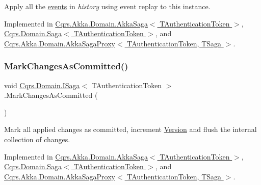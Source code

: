 Apply all the \hyperlink{}{events} in {\itshape history}  using event replay to this instance. 



Implemented in \hyperlink{classCqrs_1_1Akka_1_1Domain_1_1AkkaSaga_a40b859bc15c2f7c87a21b07f9bc9548c_a40b859bc15c2f7c87a21b07f9bc9548c}{Cqrs.\+Akka.\+Domain.\+Akka\+Saga$<$ T\+Authentication\+Token $>$}, \hyperlink{classCqrs_1_1Domain_1_1Saga_a6029fc09445e2093f7fb40e304a04ff8_a6029fc09445e2093f7fb40e304a04ff8}{Cqrs.\+Domain.\+Saga$<$ T\+Authentication\+Token $>$}, and \hyperlink{classCqrs_1_1Akka_1_1Domain_1_1AkkaSagaProxy_a21b69799b046c1fcdf5b2443699dee0c_a21b69799b046c1fcdf5b2443699dee0c}{Cqrs.\+Akka.\+Domain.\+Akka\+Saga\+Proxy$<$ T\+Authentication\+Token, T\+Saga $>$}.

\mbox{\label{interfaceCqrs_1_1Domain_1_1ISaga_a85c75f80bc5be4bad7f1d9f1231bfba7_a85c75f80bc5be4bad7f1d9f1231bfba7}} 
\subsubsection{\texorpdfstring{Mark\+Changes\+As\+Committed()}{MarkChangesAsCommitted()}}
{\footnotesize\ttfamily void \hyperlink{interfaceCqrs_1_1Domain_1_1ISaga}{Cqrs.\+Domain.\+I\+Saga}$<$ T\+Authentication\+Token $>$.Mark\+Changes\+As\+Committed (\begin{DoxyParamCaption}{ }\end{DoxyParamCaption})}



Mark all applied changes as committed, increment \hyperlink{interfaceCqrs_1_1Domain_1_1ISaga_a83a02ff45543d670356dde4149cdc614_a83a02ff45543d670356dde4149cdc614}{Version} and flush the internal collection of changes. 



Implemented in \hyperlink{classCqrs_1_1Akka_1_1Domain_1_1AkkaSaga_a83269fac4653cca097461e924feaea7f_a83269fac4653cca097461e924feaea7f}{Cqrs.\+Akka.\+Domain.\+Akka\+Saga$<$ T\+Authentication\+Token $>$}, \hyperlink{classCqrs_1_1Domain_1_1Saga_a9caac842ea6e88d6e502b63ca1820fe4_a9caac842ea6e88d6e502b63ca1820fe4}{Cqrs.\+Domain.\+Saga$<$ T\+Authentication\+Token $>$}, and \hyperlink{classCqrs_1_1Akka_1_1Domain_1_1AkkaSagaProxy_a5a5c012bc0f7f957b8bd2298956ca9ae_a5a5c012bc0f7f957b8bd2298956ca9ae}{Cqrs.\+Akka.\+Domain.\+Akka\+Saga\+Proxy$<$ T\+Authentication\+Token, T\+Saga $>$}.

